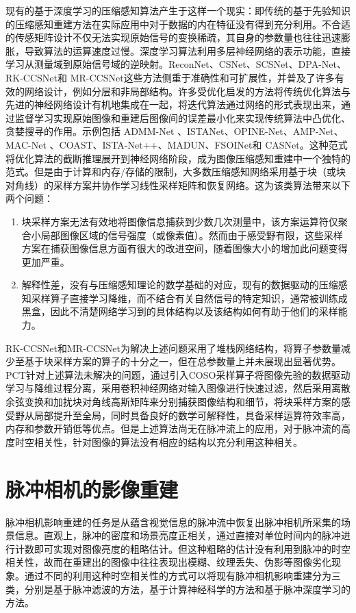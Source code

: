 现有的基于深度学习的压缩感知算法产生于这样一个现实：即传统的基于先验知识的压缩感知重建方法在实际应用中对于数据的内在特征没有得到充分利用。不合适的传感矩阵设计不仅无法实现原始信号的变换稀疏，其自身的参数量也往往迅速膨胀，导致算法的运算速度过慢。深度学习算法利用多层神经网络的表示功能，直接学习从测量域到原始信号域的逆映射。ReconNet、CSNet、SCSNet、DPA-Net、RK-CCSNet和 MR-CCSNet这些方法侧重于准确性和可扩展性，并普及了许多有效的网络设计，例如分层和非局部结构。许多受优化启发的方法将传统优化算法与先进的神经网络设计有机地集成在一起，将迭代算法通过网络的形式表现出来，通过监督学习实现原始图像和重建后图像间的误差最小化来实现传统算法中凸优化、贪婪搜寻的作用。示例包括 ADMM-Net 、ISTANet、OPINE-Net、AMP-Net、MAC-Net 、COAST、ISTA-Net++、MADUN、FSOINet和 CASNet。这种范式将优化算法的截断推理展开到神经网络阶段，成为图像压缩感知重建中一个独特的范式。但是由于计算和内存/存储的限制，大多数压缩感知网络采用基于块（或块对角线）的采样方案并协作学习线性采样矩阵和恢复网络。这为该类算法带来以下两个问题：
\begin{enumerate}
  \item 块采样方案\cite{Block_Compressed}无法有效地将图像信息捕获到少数几次测量中，该方案运算符仅聚合小局部图像区域的信号强度（或像素值）。然而由于感受野有限，这些采样方案在捕获图像信息方面有很大的改进空间，随着图像大小的增加此问题变得更加严重。
  \item 解释性差，没有与压缩感知理论的数学基础的对应，现有的数据驱动的压缩感知采样算子直接学习降维，而不结合有关自然信号的特定知识，通常被训练成黑盒，因此不清楚网络学习到的具体结构以及该结构如何有助于他们的采样能力。
\end{enumerate}

RK-CCSNet和MR-CCSNet为解决上述问题采用了堆栈网络结构，将算子参数量减少至基于块采样方案的算子的十分之一，但在总参数量上并未展现出显著优势。PCT针对上述算法未解决的问题，通过引入COSO采样算子将图像先验的数据驱动学习与降维过程分离，采用卷积神经网络对输入图像进行快速过滤，然后采用离散余弦变换和加扰块对角线高斯矩阵来分别捕获图像结构和细节，将块采样方案的感受野从局部提升至全局，同时具备良好的数学可解释性，具备采样运算符效率高，内存和参数开销低等优点。但是上述算法尚无在脉冲流上的应用，对于脉冲流的高度时空相关性，针对图像的算法没有相应的结构以充分利用这种相关。

\section{脉冲相机的影像重建}
脉冲相机影响重建的任务是从蕴含视觉信息的脉冲流中恢复出脉冲相机所采集的场景信息。直观上，脉冲的密度和场景亮度正相关，通过直接对单位时间内的脉冲进行计数即可实现对图像亮度的粗略估计。但这种粗略的估计没有利用到脉冲的时空相关性，故而在重建出的图像中往往表现出模糊、纹理丢失、伪影等图像劣化现象。通过不同的利用这种时空相关性的方式可以将现有脉冲相机影响重建分为三类，分别是基于脉冲滤波的方法，基于计算神经科学的方法和基于脉冲深度学习的方法。

